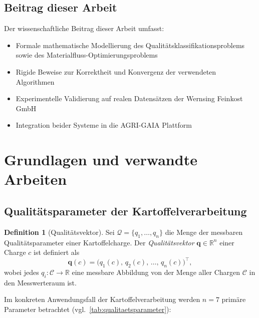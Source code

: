 ﻿\documentclass[12pt,a4paper]{article}
\theoremstyle{plain}
\theoremstyle{definition}
\newtheorem{definition}[theorem]{Definition}
\begin{document}
	\subsection{Beitrag dieser Arbeit}
	
	Der wissenschaftliche Beitrag dieser Arbeit umfasst:
	\begin{itemize}
		\item Formale mathematische Modellierung des Qualitätsklassifikationsproblems
		sowie des Materialfluss-Optimierungsproblems
		\item Rigide Beweise zur Korrektheit und Konvergenz der verwendeten Algorithmen
		\item Experimentelle Validierung auf realen Datensätzen der
		Wernsing Feinkost GmbH
		\item Integration beider Systeme in die AGRI-GAIA Plattform
	\end{itemize}
	
	\section{Grundlagen und verwandte Arbeiten}
	
	\subsection{Qualitätsparameter der Kartoffelverarbeitung}
	
	\begin{definition}[Qualitätsvektor]
		Sei $\mathcal{Q} = \{q_1, \ldots, q_n\}$ die Menge der messbaren
		Qualitätsparameter einer Kartoffelcharge. Der \emph{Qualitätsvektor}
		$\mathbf{q} \in \mathbb{R}^n$ einer Charge $c$ ist definiert als
		\[
		\mathbf{q}(c) = \bigl(q_1(c),\, q_2(c),\, \ldots,\, q_n(c)\bigr)^{\!\top},
		\]
		wobei jedes $q_i : \mathcal{C} \to \mathbb{R}$ eine messbare Abbildung
		von der Menge aller Chargen $\mathcal{C}$ in den Messwerteraum ist.
	\end{definition}
	
	Im konkreten Anwendungsfall der Kartoffelverarbeitung werden $n = 7$
	primäre Parameter betrachtet (vgl.~\cref{tab:qualitaetsparameter}):
	
\end{document}
